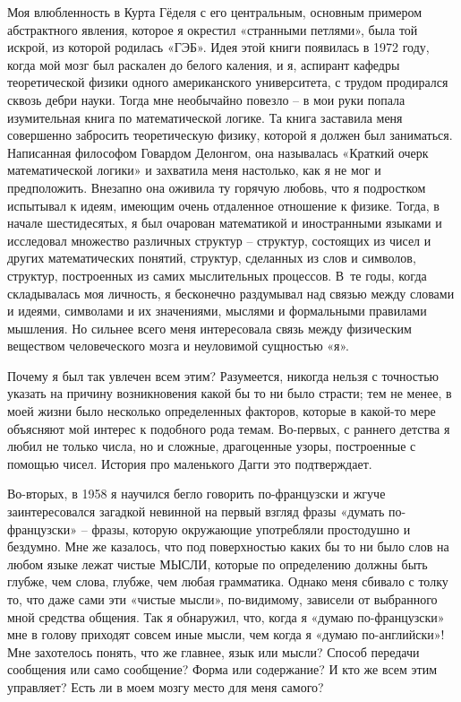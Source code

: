 \documentclass[../main.tex]{subfiles}
\begin{document}
Моя влюбленность в Курта Гёделя с его центральным, основным примером абстрактного явления, которое я окрестил «странными петлями», была той искрой, из которой родилась «ГЭБ». Идея этой книги появилась в 1972 году, когда мой мозг был раскален до белого каления, и я, аспирант кафедры теоретической физики одного американского университета, с трудом продирался сквозь дебри науки. Тогда мне необычайно повезло \--- в мои руки попала изумительная книга по математической логике. Та книга заставила меня совершенно забросить теоретическую физику, которой я должен был заниматься. Написанная философом Говардом Делонгом, она называлась «Краткий очерк математической логики» и захватила меня настолько, как я не мог и предположить. Внезапно она оживила ту горячую любовь, что я подростком испытывал к идеям, имеющим очень отдаленное отношение к физике. Тогда, в начале шестидесятых, я был очарован математикой и иностранными языками и исследовал множество различных структур \--- структур, состоящих из чисел и других математических понятий, структур, сделанных из слов и символов, структур, построенных из самих мыслительных процессов. В~те годы, когда складывалась моя личность, я бесконечно раздумывал над связью между словами и идеями, символами и их значениями, мыслями и формальными правилами мышления. Но сильнее всего меня интересовала связь между физическим веществом человеческого мозга и неуловимой сущностью «я».

Почему я был так увлечен всем этим? Разумеется, никогда нельзя с точностью указать на причину возникновения какой бы то ни было страсти; тем не менее, в моей жизни было несколько определенных факторов, которые в какой-то мере объясняют мой интерес к подобного рода темам. Во-первых, с раннего детства я любил не только числа, но и сложные, драгоценные узоры, построенные с помощью чисел. История про маленького Дагги это подтверждает.

Во-вторых, в 1958 я научился бегло говорить по-французски и жгуче заинтересовался загадкой невинной на первый взгляд фразы «думать по-французски» \--- фразы, которую окружающие употребляли простодушно и бездумно. Мне же казалось, что под поверхностью каких бы то ни было слов на любом языке лежат чистые МЫСЛИ, которые по определению должны быть глубже, чем слова, глубже, чем любая грамматика. Однако меня сбивало с толку то, что даже сами эти «чистые мысли», по-видимому, зависели от выбранного мной средства общения. Так я обнаружил, что, когда я «думаю по-французски» мне в голову приходят совсем иные мысли, чем когда я «думаю по-английски»! Мне захотелось понять, что же главнее, язык или мысли? Способ передачи сообщения или само сообщение? Форма или содержание? И кто же всем этим управляет? Есть ли в моем мозгу место для меня самого?
\end{document}
